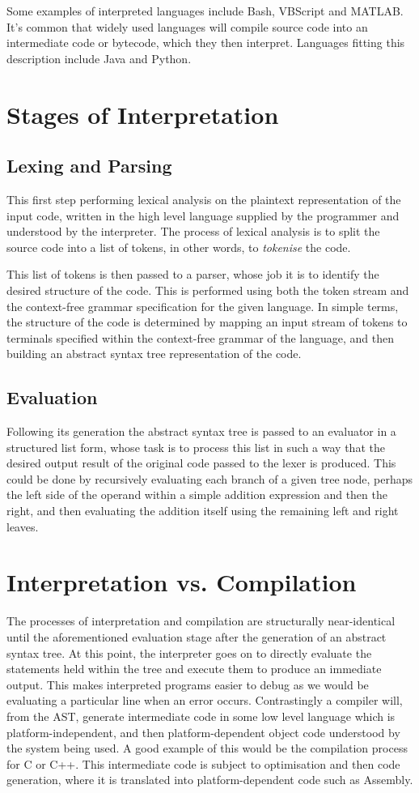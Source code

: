 \documentclass[a4paper, 11pt]{article}
\begin{document}
Some examples of interpreted languages include Bash, VBScript and MATLAB. It's common that widely used languages will compile source code into an intermediate code or bytecode, which they then interpret. Languages fitting this description include Java and Python.

\section{Stages of Interpretation}
\subsection{Lexing and Parsing}
This first step performing lexical analysis on the plaintext representation of the input code, written in the high level language supplied by the programmer and understood by the interpreter. The process of lexical analysis is to split the source code into a list of tokens, in other words, to \textit{tokenise} the code.

This list of tokens is then passed to a parser, whose job it is to identify the desired structure of the code. This is performed using both the token stream and the context-free grammar specification for the given language. In simple terms, the structure of the code is determined by mapping an input stream of tokens to terminals specified within the context-free grammar of the language, and then building an abstract syntax tree representation of the code.

\subsection{Evaluation}
Following its generation the abstract syntax tree is passed to an evaluator in a structured list form, whose task is to process this list in such a way that the desired output result of the original code passed to the lexer is produced. This could be done by recursively evaluating each branch of a given tree node, perhaps the left side of the operand within a simple addition expression and then the right, and then evaluating the addition itself using the remaining left and right leaves.

\section{Interpretation vs. Compilation}
The processes of interpretation and compilation are structurally near-identical until the aforementioned evaluation stage after the generation of an abstract syntax tree. At this point, the interpreter goes on to directly evaluate the statements held within the tree and execute them to produce an immediate output. This makes interpreted programs easier to debug as we would be evaluating a particular line when an error occurs. Contrastingly a compiler will, from the AST, generate intermediate code in some low level language which is platform-independent, and then platform-dependent object code understood by the system being used. A good example of this would be the compilation process for C or C++. This intermediate code is subject to optimisation and then code generation, where it is translated into platform-dependent code such as Assembly. 
\end{document}

